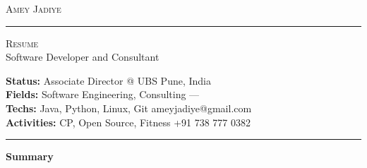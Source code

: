 \documentclass[10pt,A4]{article}
\newcommand{\cvsection}[1]
{
	\begin{center}
		\large\textcolor{sectcol}{\textbf{#1}}
	\end{center}
}
\newcommand{\metasection}[2]
{
\footnotesize{#2} \hspace*{\fill} \footnotesize{#1}\\[1pt]
}
\begin{document}
\pagestyle{fancy}	








\vspace{-8pt}
\begin{center}
	\HUGE \textsc{Amey Jadiye} \textcolor{sectcol}{\rule[-1mm]{1mm}{0.9cm}} \textsc{Resume}\\[2pt]
	\small Software Developer and Consultant
\end{center}



\vspace{6pt}


\metasection{Pune, India}{\textbf{Status:} Associate Director @ UBS}
\metasection{---}{\textbf{Fields:} Software Engineering, Consulting} 
\metasection{ameyjadiye@gmail.com}{\textbf{Techs:} Java, Python, Linux, Git}
\metasection{+91 738 777 0382}{\textbf{Activities:} CP, Open Source, Fitness}
\vspace{-2pt}
\textcolor{softcol}{\hrule}
\vspace{6pt}

\normalsize

\vspace{-6pt}
\cvsection{Summary}
\end{document}
